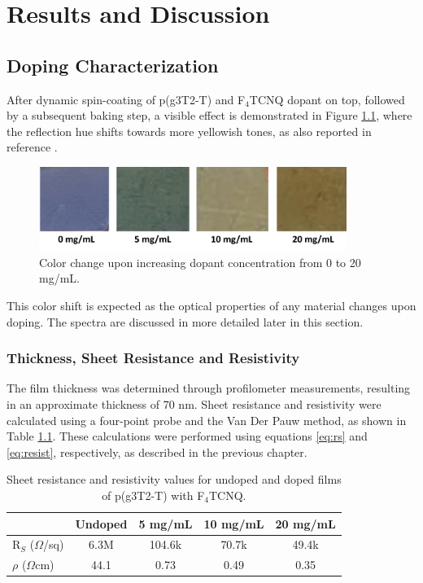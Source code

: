\chapter{Results and Discussion} \label{cha:3}

\section{Doping Characterization}

After dynamic spin-coating of p(g3T2-T) and F$_{4}$TCNQ dopant on top, followed by a subsequent baking step, a visible effect is demonstrated in Figure \ref{fig:color}, where the reflection hue shifts towards more yellowish tones, as also reported in reference \cite{tanTuningOrganicElectrochemical2022}. 

\begin{figure}[ht]
  \centering
  \includegraphics[width=10cm]{Images/pdf/doping_color.pdf}
  \caption[Color shift upon doping level increase]{Color change upon increasing dopant concentration from 0 to 20 mg/mL.
  \label{fig:color}}
\end{figure}

This color shift is expected as the optical properties of any material changes upon doping. The spectra are discussed in more detailed later in this section.

\subsection{Thickness, Sheet Resistance and Resistivity}

The film thickness was determined through profilometer measurements, resulting in an approximate thickness of 70 nm. Sheet resistance and resistivity were calculated using a four-point probe and the Van Der Pauw method, as shown in Table \ref{tab:res}. These calculations were performed using equations \ref{eq:rs} and \ref{eq:resist}, respectively, as described in the previous chapter. 

\begin{table}[ht]
\centering
\caption{Sheet resistance and resistivity values for undoped and doped films of p(g3T2-T) with F$_{4}$TCNQ.}
\begin{tabular}{l|c|c|c|c}
& Undoped & 5 mg/mL & 10 mg/mL & 20 mg/mL \\\hline
R$_{S}$ ($\Omega$/sq) & 6.3M & 104.6k & 70.7k & 49.4k\\
$\rho$ ($\Omega$cm) & 44.1 & 0.73 & 0.49 & 0.35\\\hline
\end{tabular}
\label{tab:res}
\end{table}

